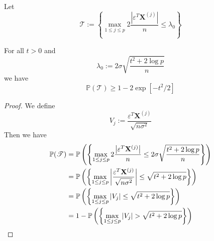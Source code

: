 Let
$$\mathscr{T} := \left\{\max _{1 \leq j \leq p} 2 \frac{\left| \varepsilon^{T} \mathbf{X}^{(j)}\right|}{n} \leq \lambda_{0}\right\}$$

\begin{lemma}[Lemma 6.2.]
    For all $t > 0$ and
    $$\lambda_{0}:=2 \sigma \sqrt{\frac{t^{2}+2 \log p}{n}}$$
    we have
    $$\mathbb{P}(\mathscr{T}) \geq 1-2 \exp \left[-t^{2} / 2\right]$$
\end{lemma}
\begin{proof}
    We define
    $$V_{j} := \frac{\varepsilon^{T} \mathbf{X}^{(j)}}{\sqrt{n \sigma^{2}}}$$
    Then we have
    \begin{align*}
        \mathbb{P}(\mathscr{T})
         & = \P \left( \left\{\max _{1 \leq j \leq p} 2 \frac{\left| \varepsilon^{T} \mathbf{X}^{(j)}\right|}{n} \leq 2 \sigma \sqrt{\frac{t^{2}+2 \log p}{n}} \right\} \right) \\
         & =
        \P \left( \left\{\max _{1 \leq j \leq p} \left| \frac{\varepsilon^{T} \mathbf{X}^{(j)}}{\sqrt{n \sigma^{2}}} \right| \leq \sqrt{t^{2}+2 \log p} \right\} \right)        \\
         & =
        \P \left( \left\{\max _{1 \leq j \leq p} | V_{j} | \leq \sqrt{t^{2}+2 \log p} \right\} \right)                                                                          \\
         & = 1 - \P \left( \left\{\max _{1 \leq j \leq p} | V_{j} | > \sqrt{t^{2}+2 \log p} \right\} \right)                                                                    \\
    \end{align*}
\end{proof}

